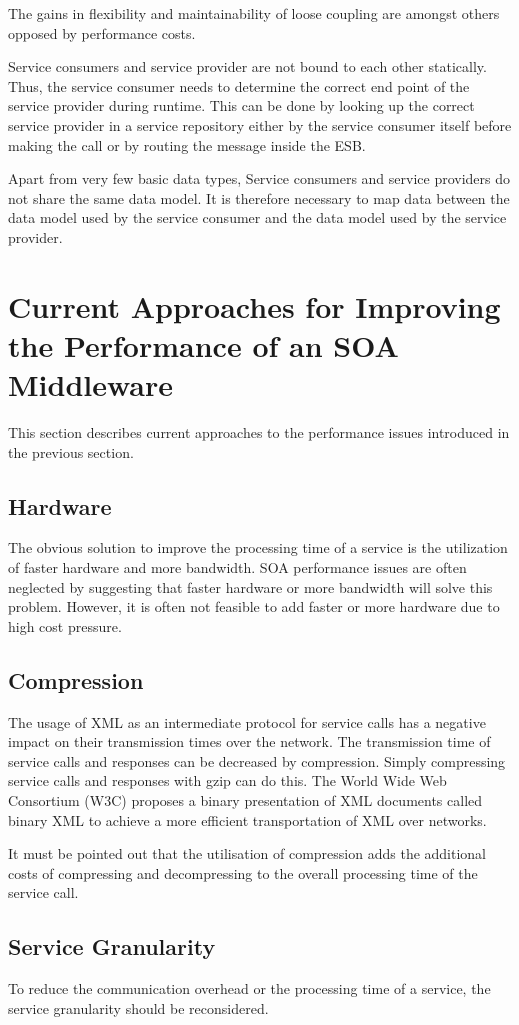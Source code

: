 The gains in flexibility and maintainability of loose coupling are amongst others opposed by performance costs.

Service consumers and service provider are not bound to each other statically. Thus, the service consumer needs to determine the correct end point of the service provider during runtime. This can be done by looking up the correct service provider in a service repository either by the service consumer itself before making the call or by routing the message inside the ESB.  

Apart from very few basic data types, Service consumers and service providers do not share the same data model. It is therefore necessary to map data between the data model used by the service consumer and the data model used by the service provider.
\section{Current Approaches for Improving the Performance of an SOA Middleware}
This section describes current approaches to the performance issues introduced in the previous section.
\subsection{Hardware}
The obvious solution to improve the processing time of a service is the utilization of faster hardware and more bandwidth. SOA performance issues are often neglected by suggesting that faster hardware or more bandwidth will solve this problem. However, it is often not feasible to add faster or more hardware due to high cost pressure.
\subsection{Compression}
The usage of XML as an intermediate protocol for service calls has a negative impact on their transmission times over the network. The transmission time of service calls and responses can be decreased by compression. Simply compressing service calls and responses with gzip can do this. The World Wide Web Consortium (W3C) proposes a binary presentation of XML documents called binary XML \citep{EXI:2007} to achieve a more efficient transportation of XML over networks.

It must be pointed out that the utilisation of compression adds the additional costs of compressing and decompressing to the overall processing time of the service call.
\subsection{Service Granularity}
To reduce the communication overhead or the processing time of a service, the service granularity should be reconsidered.


